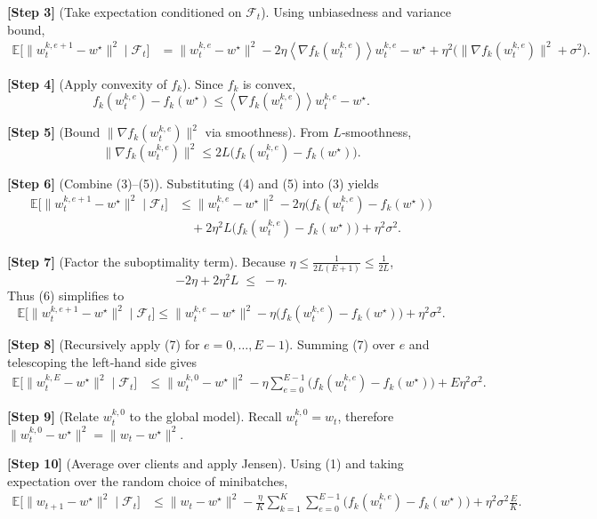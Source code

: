 \documentclass[11pt]{article}
\newcommand{\E}{\mathbb{E}}
\newcommand{\inner}[1]{\left\langle#1\right\rangle}
\newcommand{\grad}{\nabla}
\begin{document}
\noindent\textbf{[Step 3]} (Take expectation conditioned on $\mathcal{F}_t$).  
Using unbiasedness and variance bound,
\[
\begin{aligned}
\E\!\big[\|w_{t}^{k,e+1}-w^\star\|^2\mid\mathcal{F}_t\big]
&= \|w_{t}^{k,e}-w^\star\|^2
   -2\eta\inner{\grad f_k(w_{t}^{k,e})}{w_{t}^{k,e}-w^\star}
   +\eta^2\big(\|\grad f_k(w_{t}^{k,e})\|^2+\sigma^2\big) .
\end{aligned}
\tag{3}
\]

\noindent\textbf{[Step 4]} (Apply convexity of $f_k$).  
Since $f_k$ is convex,
\[
f_k(w_{t}^{k,e})-f_k(w^\star)\le\inner{\grad f_k(w_{t}^{k,e})}{w_{t}^{k,e}-w^\star}.
\tag{4}
\]

\noindent\textbf{[Step 5]} (Bound $\|\grad f_k(w_{t}^{k,e})\|^2$ via smoothness).  
From $L$‑smoothness,
\[
\|\grad f_k(w_{t}^{k,e})\|^2\le 2L\big(f_k(w_{t}^{k,e})-f_k(w^\star)\big).
\tag{5}
\]

\noindent\textbf{[Step 6]} (Combine (3)–(5)).  
Substituting (4) and (5) into (3) yields
\[
\begin{aligned}
\E\!\big[\|w_{t}^{k,e+1}-w^\star\|^2\mid\mathcal{F}_t\big]
&\le \|w_{t}^{k,e}-w^\star\|^2
   -2\eta\big(f_k(w_{t}^{k,e})-f_k(w^\star)\big) \\
&\quad +2\eta^2 L\big(f_k(w_{t}^{k,e})-f_k(w^\star)\big)
   +\eta^2\sigma^2 .
\end{aligned}
\tag{6}
\]

\noindent\textbf{[Step 7]} (Factor the suboptimality term).  
Because $\eta\le\frac1{2L(E+1)}\le\frac1{2L}$,
\[
-2\eta +2\eta^2L \;\le\; -\eta .
\]
Thus (6) simplifies to
\[
\E\!\big[\|w_{t}^{k,e+1}-w^\star\|^2\mid\mathcal{F}_t\big]
\le \|w_{t}^{k,e}-w^\star\|^2
   -\eta\big(f_k(w_{t}^{k,e})-f_k(w^\star)\big)
   +\eta^2\sigma^2 .
\tag{7}
\]

\noindent\textbf{[Step 8]} (Recursively apply (7) for $e=0,\dots,E-1$).  
Summing (7) over $e$ and telescoping the left‑hand side gives
\[
\begin{aligned}
\E\!\big[\|w_{t}^{k,E}-w^\star\|^2\mid\mathcal{F}_t\big]
&\le \|w_{t}^{k,0}-w^\star\|^2
   -\eta\sum_{e=0}^{E-1}\big(f_k(w_{t}^{k,e})-f_k(w^\star)\big)
   +E\eta^2\sigma^2 .
\end{aligned}
\tag{8}
\]

\noindent\textbf{[Step 9]} (Relate $w_{t}^{k,0}$ to the global model).  
Recall $w_{t}^{k,0}=w_t$, therefore $\|w_{t}^{k,0}-w^\star\|^2=\|w_t-w^\star\|^2$.

\noindent\textbf{[Step 10]} (Average over clients and apply Jensen).  
Using (1) and taking expectation over the random choice of minibatches,
\[
\begin{aligned}
\E\!\big[\|w_{t+1}-w^\star\|^2\mid\mathcal{F}_t\big]
&\le \|w_t-w^\star\|^2
   -\frac{\eta}{K}\sum_{k=1}^{K}\sum_{e=0}^{E-1}
      \big(f_k(w_{t}^{k,e})-f_k(w^\star)\big)
   +\eta^2\sigma^2\frac{E}{K}.
\end{aligned}
\tag{9}
\]
\end{document}
